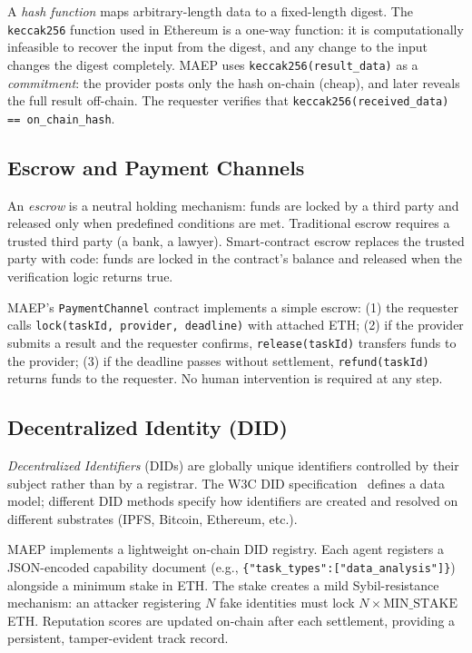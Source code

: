 \documentclass[conference]{IEEEtran}
\begin{document}
A \emph{hash function} maps arbitrary-length data to a fixed-length
digest.  The \texttt{keccak256} function used in Ethereum is a
one-way function: it is computationally infeasible to recover the
input from the digest, and any change to the input changes the digest
completely.  MAEP uses \texttt{keccak256(result\_data)} as a
\emph{commitment}: the provider posts only the hash on-chain (cheap),
and later reveals the full result off-chain.  The requester verifies
that \texttt{keccak256(received\_data) == on\_chain\_hash}.

\subsection{Escrow and Payment Channels}

An \emph{escrow} is a neutral holding mechanism: funds are locked by
a third party and released only when predefined conditions are met.
Traditional escrow requires a trusted third party (a bank, a lawyer).
Smart-contract escrow replaces the trusted party with code: funds are
locked in the contract's balance and released when the verification
logic returns true.

MAEP's \texttt{PaymentChannel} contract implements a simple escrow:
(1) the requester calls \texttt{lock(taskId, provider, deadline)} with
attached ETH; (2) if the provider submits a result and the requester
confirms, \texttt{release(taskId)} transfers funds to the provider;
(3) if the deadline passes without settlement, \texttt{refund(taskId)}
returns funds to the requester.  No human intervention is required at
any step.

\subsection{Decentralized Identity (DID)}

\emph{Decentralized Identifiers} (DIDs) are globally unique identifiers
controlled by their subject rather than by a registrar.  The W3C DID
specification~\cite{w3c_did} defines a data model; different DID
methods specify how identifiers are created and resolved on different
substrates (IPFS, Bitcoin, Ethereum, etc.).

MAEP implements a lightweight on-chain DID registry.  Each agent
registers a JSON-encoded capability document
(e.g., \texttt{\{"task\_types":["data\_analysis"]\}}) alongside a
minimum stake in ETH.  The stake creates a mild Sybil-resistance
mechanism: an attacker registering $N$ fake identities must lock
$N \times \text{MIN\_STAKE}$ ETH.  Reputation scores are updated
on-chain after each settlement, providing a persistent, tamper-evident
track record.
\end{document}
